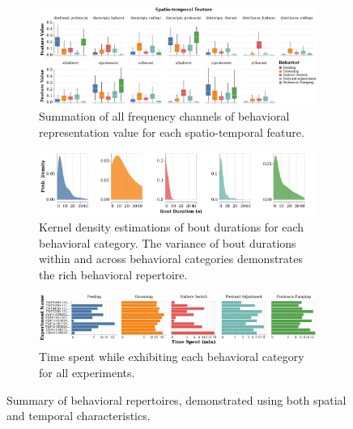 \begin{figure}[htb!]
	\centering
	\begin{subfigure}[b]{0.95\linewidth}
		\centering
		\includegraphics[width=\linewidth]{figures/FeatureDistributions_perBehavior-Ann.pdf}
		\caption{Summation of all frequency channels of behavioral representation value for each spatio-temporal feature.\label{figure:feature-distributions}}
	\end{subfigure}%

	\centering
	\begin{subfigure}[b]{0.95\linewidth}
		\centering
		\includegraphics[width=\linewidth]{figures/BoutDurationDistributions-Ann.pdf}
		\caption{Kernel density estimations of bout durations for each behavioral category. The variance of bout durations within and across behavioral categories demonstrates the rich behavioral repertoire. \label{figure:bout-durations}}
	\end{subfigure}%

	\centering
	\begin{subfigure}[b!]{0.95\linewidth}
		\centering
		\includegraphics[width=\linewidth]{figures/TimeSpent-perBehavior-Ann.pdf}
		\caption{Time spent while exhibiting each behavioral category for all experiments. \label{figure:time-spent-in-behaviors}}
	\end{subfigure}%
	\caption{Summary of behavioral repertoires, demonstrated using both spatial and temporal characteristics. \label{figure:summary-behavior-characteristics}}
\end{figure}

